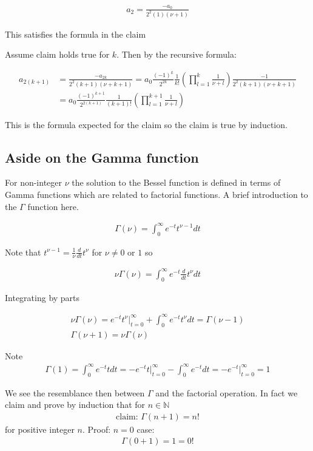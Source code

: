 \documentclass[12pt]{article}
\begin{document}
\begin{align}
a_2 = \frac{-a_0}{2^2(1)(\nu+1)}
\end{align}

This satisfies the formula in the claim

Assume claim holds true for $k$. Then by the recursive formula:

\begin{align}
a_{2(k+1)} &= \frac{-a_{2k}}{2^2 (k+1)(\nu+k+1)} = a_0 \frac{(-1)^k}{2^{2k}}\frac{1}{k!} \left(\prod_{l=1}^k \frac{1}{\nu+l}\right) \frac{-1}{2^2 (k+1)(\nu+k+1)}\\
&= a_0 \frac{(-1)^{k+1}}{2^{2(k+1)}}\frac{1}{(k+1)!}\left(\prod_{l=1}^{k+1} \frac{1}{\nu+l}\right) 
\end{align}

This is the formula expected for the claim so the claim is true by induction.

\subsection{Aside on the Gamma function}
For non-integer $\nu$ the solution to the Bessel function is defined in terms of Gamma functions which are related to factorial functions. A brief introduction to the $\Gamma$ function here.

\begin{align}
\Gamma(\nu) = \int_0^{\infty} e^{-t} t^{\nu-1} dt
\end{align}

Note that $t^{\nu-1} = \frac{1}{\nu}\frac{d}{dt} t^{\nu}$ for $\nu \neq 0 \text{ or } 1$ so

\begin{align}
\nu \Gamma(\nu) = \int_0^{\infty} e^{-t} \frac{d}{dt} t^{\nu} dt
\end{align}

Integrating by parts

\begin{align}
\nu\Gamma(\nu)= e^{-t} t^{\nu}\big|_{t=0}^{\infty} + \int_{0}^{\infty} e^{-t}t^{\nu} dt = \Gamma(\nu-1)\\
\Gamma(\nu+1) = \nu \Gamma(\nu)
\end{align}

Note 
\begin{align}
\Gamma(1) = \int_0^{\infty} e^{-t} t dt = -e^{-t}t\big|_{t=0}^{\infty} - \int_{0}^{\infty} e^{-t} dt = -e^{-t}\big|_{t=0}^{\infty} = 1
\end{align}

We see the resemblance then between $\Gamma$ and the factorial operation. In fact we claim and prove by induction that for $n \in \mathbb{N}$ 
\begin{align}
\text{claim: } \Gamma(n+1) = n!
\end{align}
for positive integer $n$.
Proof:
$n=0$ case:
\begin{align}
\Gamma(0+1) = 1 = 0!
\end{align}
\end{document}
